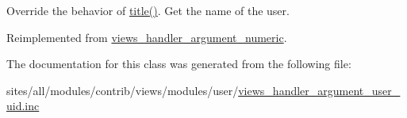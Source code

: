 Override the behavior of \hyperlink{classviews__handler__argument__numeric_480758dbcde899b5483b091e51e2bf39}{title()}. Get the name of the user. 

Reimplemented from \hyperlink{classviews__handler__argument__numeric_5c6f566b06bad6057e92f15d82311c7b}{views\_\-handler\_\-argument\_\-numeric}.

The documentation for this class was generated from the following file:\begin{CompactItemize}
\item 
sites/all/modules/contrib/views/modules/user/\hyperlink{views__handler__argument__user__uid_8inc}{views\_\-handler\_\-argument\_\-user\_\-uid.inc}\end{CompactItemize}

